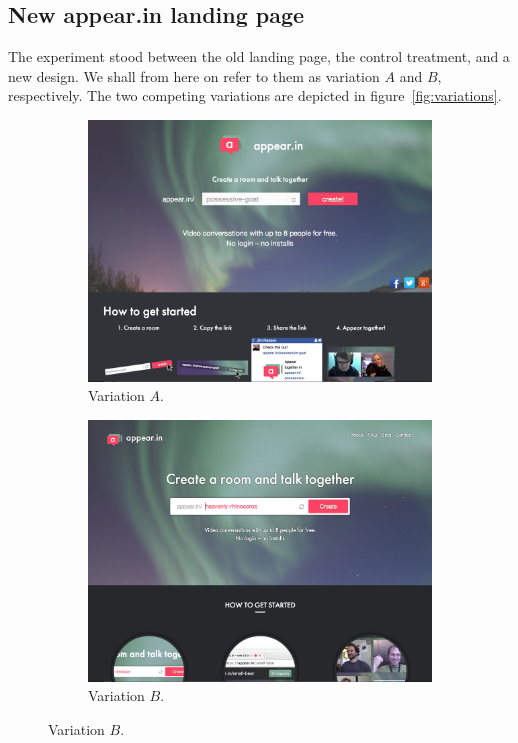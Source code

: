 \subsection{New appear.in landing page}
\label{eval:sub:new_landing_page}

The experiment stood between the old landing page, the control treatment, and a new design. We shall from here on refer to them as variation $A$ and $B$, respectively. The two competing variations are depicted in figure~\ref{fig:variations}.

\begin{figure}[h]
  \centering
    \begin{subfigure}[t]{0.8\textwidth}
      \centering
      \includegraphics[width=\textwidth]{Figures/screenshots/ab-frontpage/variation-off}
      \caption{Variation $A$.}
      \label{fig:variation_a}
    \end{subfigure}

    \vspace{1em}

    \begin{subfigure}[t]{0.8\textwidth}
      \centering
      \includegraphics[width=\textwidth]{Figures/screenshots/ab-frontpage/variation-on}
      \caption{Variation $B$.}
      \label{fig:variation_b}
    \end{subfigure}


\end{figure}
